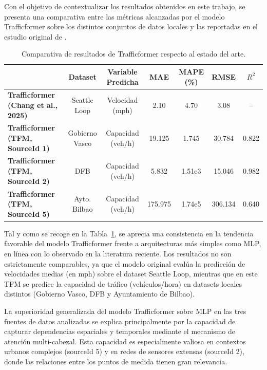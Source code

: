 Con el objetivo de contextualizar los resultados obtenidos en este trabajo, se presenta una comparativa entre las métricas alcanzadas por el modelo Trafficformer sobre los distintos conjuntos de datos locales y las reportadas en el estudio original de \cite{trafficformer}. 

\begin{table}[H]
	\centering
	\small
	\caption{Comparativa de resultados de Trafficformer respecto al estado del arte.}
	\label{tab:comparativa_trafficformer}
	\begin{tabular}{lcccccc}
		\toprule
		& \textbf{Dataset} & \textbf{Variable Predicha} & \textbf{MAE} & \textbf{MAPE (\%)} & \textbf{RMSE} & \textbf{$R^2$} \\
		\midrule
		\textbf{Trafficformer (Chang et al., 2025)} & Seattle Loop & Velocidad (mph) & 2.10 & 4.70 & 3.08 & -- \\
		\textbf{Trafficformer (TFM, SourceId 1)} & Gobierno Vasco & Capacidad (veh/h) & 19.125 & 1.745 & 30.784 & 0.822 \\
		\textbf{Trafficformer (TFM, SourceId 2)} & DFB & Capacidad (veh/h) & 5.832 & 1.51e3 & 15.046 & 0.982 \\
		\textbf{Trafficformer (TFM, SourceId 5)} & Ayto. Bilbao & Capacidad (veh/h) & 175.975 & 1.74e5 & 306.134 & 0.640 \\
		\bottomrule
	\end{tabular}
\end{table}

Tal y como se recoge en la Tabla~\ref{tab:comparativa_trafficformer}, se aprecia una consistencia en la tendencia favorable del modelo Trafficformer frente a arquitecturas más simples como MLP, en línea con lo observado en la literatura reciente.
Los resultados no son estrictamente comparables, ya que el modelo original evalúa la predicción de velocidades medias (en mph) sobre el dataset Seattle Loop, mientras que en este TFM se predice la capacidad de tráfico (vehículos/hora) en datasets locales distintos (Gobierno Vasco, DFB y Ayuntamiento de Bilbao).

La superioridad generalizada del modelo Trafficformer sobre MLP en las tres fuentes de datos analizadas se explica principalmente por la capacidad de capturar dependencias espaciales y temporales mediante el mecanismo de atención multi-cabezal. Esta capacidad es especialmente valiosa en contextos urbanos complejos (sourceId 5) y en redes de sensores extensas (sourceId 2), donde las relaciones entre los puntos de medida tienen gran relevancia.

